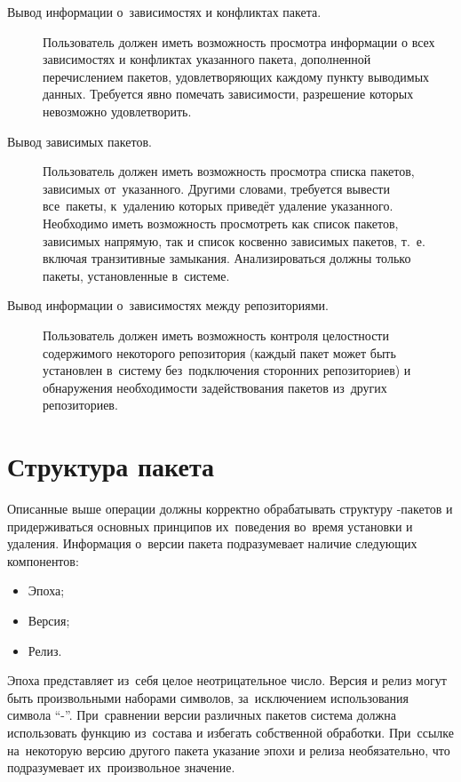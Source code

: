 \begin{description}
\item[Вывод информации о~зависимостях и конфликтах пакета.]
Пользователь должен иметь возможность просмотра информации 
о всех зависимостях и конфликтах указанного пакета, дополненной перечислением пакетов, удовлетворяющих каждому пункту выводимых данных.
Требуется явно помечать зависимости, разрешение которых невозможно удовлетворить.

\item[Вывод зависимых пакетов.]
Пользователь должен иметь возможность просмотра списка пакетов, зависимых от~указанного.
Другими словами, требуется вывести все~пакеты, к~удалению которых приведёт удаление указанного.
Необходимо иметь возможность просмотреть как список пакетов, зависимых напрямую, 
так и список косвенно зависимых пакетов, т.~е. включая транзитивные замыкания.
Анализироваться должны только пакеты, установленные в~системе.

\item[Вывод информации о~зависимостях между репозиториями.]
Пользователь должен иметь возможность контроля 
целостности содержимого некоторого репозитория (каждый пакет может быть установлен в~систему без~подключения сторонних репозиториев)
и обнаружения необходимости   задействования пакетов из~других репозиториев. 

\end{description}

\section{Структура пакета}
\label{pkgstruct}

Описанные выше операции должны корректно обрабатывать структуру -пакетов и 
придерживаться основных принципов их~поведения во~время установки и удаления.
Информация о~версии пакета подразумевает наличие следующих компонентов:

\begin{itemize}
\item {Эпоха;}
\item{Версия;}
\item {Релиз.}
\end{itemize}

Эпоха представляет из~себя целое неотрицательное число. 
Версия и релиз могут быть произвольными наборами символов, за~исключением использования символа ``-''.
При~сравнении версии различных пакетов система должна использовать функцию  из~состава 
и избегать собственной обработки. 
При~ссылке на~некоторую версию другого пакета указание эпохи и релиза необязательно,
что подразумевает их~произвольное значение.

